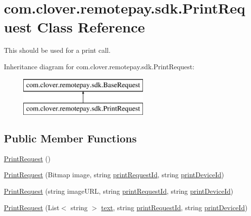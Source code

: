 \hypertarget{classcom_1_1clover_1_1remotepay_1_1sdk_1_1_print_request}{}\section{com.\+clover.\+remotepay.\+sdk.\+Print\+Request Class Reference}
\label{classcom_1_1clover_1_1remotepay_1_1sdk_1_1_print_request}


This should be used for a print call.  


Inheritance diagram for com.\+clover.\+remotepay.\+sdk.\+Print\+Request\+:\begin{figure}[H]
\begin{center}
\leavevmode
\includegraphics[height=2.000000cm]{classcom_1_1clover_1_1remotepay_1_1sdk_1_1_print_request}
\end{center}
\end{figure}
\subsection*{Public Member Functions}
\begin{DoxyCompactItemize}
\item 
\hyperlink{classcom_1_1clover_1_1remotepay_1_1sdk_1_1_print_request_a40305efe6c6354d8e994f22767c94c19}{Print\+Request} ()
\item 
\hyperlink{classcom_1_1clover_1_1remotepay_1_1sdk_1_1_print_request_a394189b6f8917be13b8fd5fefe9f96ff}{Print\+Request} (Bitmap image, string \hyperlink{classcom_1_1clover_1_1remotepay_1_1sdk_1_1_print_request_a935f0aed3de84a482fd0fb4a84027acc}{print\+Request\+Id}, string \hyperlink{classcom_1_1clover_1_1remotepay_1_1sdk_1_1_print_request_ab0198507ca2b0478d0406d20d3eceb3e}{print\+Device\+Id})
\item 
\hyperlink{classcom_1_1clover_1_1remotepay_1_1sdk_1_1_print_request_a09442753b6abb881e9f3f3ed63c8df24}{Print\+Request} (string image\+U\+RL, string \hyperlink{classcom_1_1clover_1_1remotepay_1_1sdk_1_1_print_request_a935f0aed3de84a482fd0fb4a84027acc}{print\+Request\+Id}, string \hyperlink{classcom_1_1clover_1_1remotepay_1_1sdk_1_1_print_request_ab0198507ca2b0478d0406d20d3eceb3e}{print\+Device\+Id})
\item 
\hyperlink{classcom_1_1clover_1_1remotepay_1_1sdk_1_1_print_request_a5962d2c169afbdf4c5aba28a998b1a3b}{Print\+Request} (List$<$ string $>$ \hyperlink{classcom_1_1clover_1_1remotepay_1_1sdk_1_1_print_request_ad10de4093d7e4f95539de84ba1ada767}{text}, string \hyperlink{classcom_1_1clover_1_1remotepay_1_1sdk_1_1_print_request_a935f0aed3de84a482fd0fb4a84027acc}{print\+Request\+Id}, string \hyperlink{classcom_1_1clover_1_1remotepay_1_1sdk_1_1_print_request_ab0198507ca2b0478d0406d20d3eceb3e}{print\+Device\+Id})
\end{DoxyCompactItemize}
